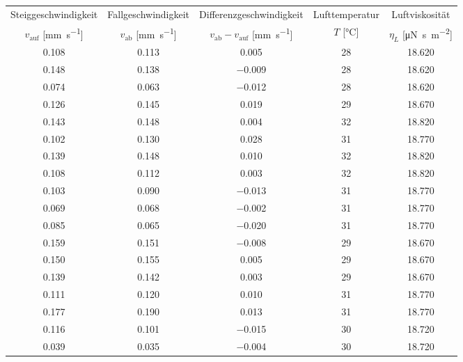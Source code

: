 \begin{table}[!h]
	\centering
	\begin{adjustbox}{width=\textwidth, center}
	\begin{tabular}{|c|c|c|c|c|}
		\hline
		Steiggeschwindigkeit & Fallgeschwindigkeit & Differenzgeschwindigkeit & Lufttemperatur & Luftviskosität\\
		$v_{\text{auf}}$ [\si{\milli\meter\per\second}] & $v_{\text{ab}}$ [\si{\milli\meter\per\second}] & $v_{\text{ab}} - v_{\text{auf}}$ [\si{\milli\meter\per\second}] & $T$ [\si{\celsius}] & $\eta_{L}$ [\si{\micro\newton\second\per\square\meter}]\\
\hline\hline
		\num{0.108} & \num{0.113} & \num{0.005} & \num{28} & \num{18.620}\\
		\num{0.148} & \num{0.138} & \num{-0.009} & \num{28} & \num{18.620}\\
		\num{0.074} & \num{0.063} & \num{-0.012} & \num{28} & \num{18.620}\\
		\num{0.126} & \num{0.145} & \num{0.019} & \num{29} & \num{18.670}\\
		\num{0.143} & \num{0.148} & \num{0.004} & \num{32} & \num{18.820}\\
		\num{0.102} & \num{0.130} & \num{0.028} & \num{31} & \num{18.770}\\
		\num{0.139} & \num{0.148} & \num{0.010} & \num{32} & \num{18.820}\\
		\num{0.108} & \num{0.112} & \num{0.003} & \num{32} & \num{18.820}\\
		\num{0.103} & \num{0.090} & \num{-0.013} & \num{31} & \num{18.770}\\
		\num{0.069} & \num{0.068} & \num{-0.002} & \num{31} & \num{18.770}\\
		\num{0.085} & \num{0.065} & \num{-0.020} & \num{31} & \num{18.770}\\
		\num{0.159} & \num{0.151} & \num{-0.008} & \num{29} & \num{18.670}\\
		\num{0.150} & \num{0.155} & \num{0.005} & \num{29} & \num{18.670}\\
		\num{0.139} & \num{0.142} & \num{0.003} & \num{29} & \num{18.670}\\
		\num{0.111} & \num{0.120} & \num{0.010} & \num{31} & \num{18.770}\\
		\num{0.177} & \num{0.190} & \num{0.013} & \num{31} & \num{18.770}\\
		\num{0.116} & \num{0.101} & \num{-0.015} & \num{30} & \num{18.720}\\
		\num{0.039} & \num{0.035} & \num{-0.004} & \num{30} & \num{18.720}\\

\end{tabular}
\end{adjustbox}
\end{table}
